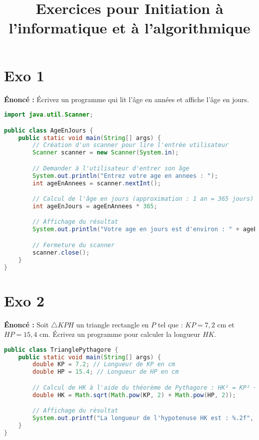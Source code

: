 \documentclass{article}
\title{Exercices pour Initiation \`a l'informatique et \`a l'algorithmique}
\author{}
\date{}
\begin{document}
\maketitle

\section*{Exo 1}
\noindent \textbf{Énoncé :} Écrivez un programme qui lit l'\^age en ann\'ees et affiche l'\^age en jours.

\begin{lstlisting}[language=Java]
import java.util.Scanner;

public class AgeEnJours {
    public static void main(String[] args) {
        // Création d'un scanner pour lire l'entrée utilisateur
        Scanner scanner = new Scanner(System.in);

        // Demander à l'utilisateur d'entrer son âge
        System.out.println("Entrez votre age en annees : ");
        int ageEnAnnees = scanner.nextInt();

        // Calcul de l'âge en jours (approximation : 1 an = 365 jours)
        int ageEnJours = ageEnAnnees * 365;

        // Affichage du résultat
        System.out.println("Votre age en jours est d'environ : " + ageEnJours + " jours.");

        // Fermeture du scanner
        scanner.close();
    }
}
\end{lstlisting}
\clearpage

\section*{Exo 2}
\noindent \textbf{Énoncé :} Soit $\triangle KPH$ un triangle rectangle en $P$ tel que : $KP = 7,2$ cm et $HP = 15,4$ cm. Écrivez un programme pour calculer la longueur $HK$.

\begin{lstlisting}[language=Java]
public class TrianglePythagore {
    public static void main(String[] args) {
        double KP = 7.2; // Longueur de KP en cm
        double HP = 15.4; // Longueur de HP en cm

        // Calcul de HK à l'aide du théorème de Pythagore : HK² = KP² + HP²
        double HK = Math.sqrt(Math.pow(KP, 2) + Math.pow(HP, 2));

        // Affichage du résultat
        System.out.printf("La longueur de l'hypotenuse HK est : %.2f", HK);
    }
}
\end{lstlisting}
\clearpage
\end{document}
